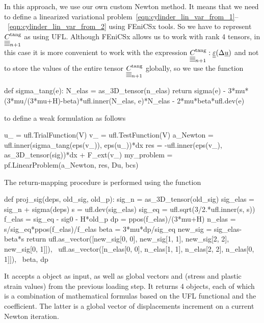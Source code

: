 \documentclass[12pt]{article}
\begin{document}
In this approach, we use our own custom Newton method. It means that we need to define a linearized variational problem~\eqref{eqn:cylinder_lin_var_from_1}--~\eqref{eqn:cylinder_lin_var_from_2} using FEniCSx tools. So we have to represent $\underline{\underline{\underline{\underline{C_{}}}}}_{n+1}^\text{tang}$ as  using UFL. Although FEniCSx allows us to work with rank 4 tensors, in this case it is more convenient to work with the expression $\underline{\underline{\underline{\underline{C_{}}}}}_{n+1}^\text{tang} : \underline{\underline{\varepsilon}}(\Delta\underline{u})$ and not to store the values of the entire tensor $\underline{\underline{\underline{\underline{C_{}}}}}_{n+1}^\text{tang}$ globally, so we use the function  
\begin{pythoncode}
    def sigma_tang(e):
    N_elas = as_3D_tensor(n_elas)
    return sigma(e) - 3*mu*(3*mu/(3*mu+H)-beta)*ufl.inner(N_elas, e)*N_elas - 2*mu*beta*ufl.dev(e)  
\end{pythoncode}
to define a weak formulation as follows
\begin{pythoncode}
    u_ = ufl.TrialFunction(V)
    v_ = ufl.TestFunction(V)
    a_Newton = ufl.inner(sigma_tang(eps(v_)), eps(u_))*dx
    res = -ufl.inner(eps(v_), as_3D_tensor(sig))*dx + F_ext(v_)
    my_problem = pf.LinearProblem(a_Newton, res, Du, bcs)
\end{pythoncode}
The return-mapping procedure is performed using the  function
\begin{pythoncode}
    def proj_sig(deps, old_sig, old_p):
        sig_n = as_3D_tensor(old_sig)
        sig_elas = sig_n + sigma(deps)
        s = ufl.dev(sig_elas)
        sig_eq = ufl.sqrt(3/2.*ufl.inner(s, s))
        f_elas = sig_eq - sig0 - H*old_p
        dp = ppos(f_elas)/(3*mu+H)
        n_elas = s/sig_eq*ppos(f_elas)/f_elas
        beta = 3*mu*dp/sig_eq
        new_sig = sig_elas-beta*s
        return ufl.as_vector([new_sig[0, 0], new_sig[1, 1], new_sig[2, 2], new_sig[0, 1]]), \
            ufl.as_vector([n_elas[0, 0], n_elas[1, 1], n_elas[2, 2], n_elas[0, 1]]), \
            beta, dp       
\end{pythoncode}

It accepts a  object  as input, as well as global vectors  and  (stress and plastic strain values) from the previous loading step. It returns 4  objects, each of which is a combination of mathematical formulas based on the UFL functional and the  coefficient. The latter is a global vector of displacements increment on a current Newton iteration.
\end{document}
